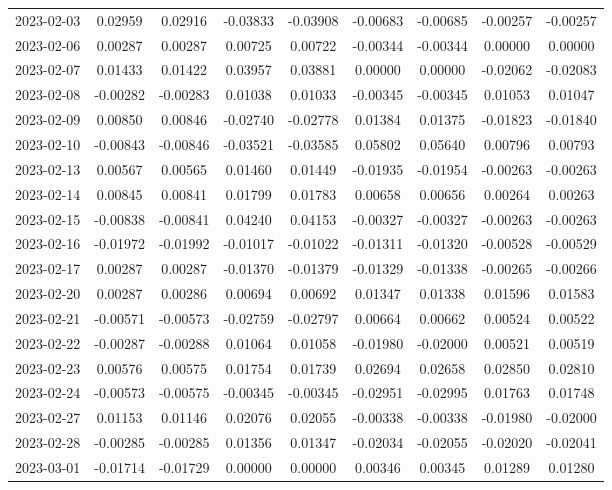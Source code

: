 {\begin{footnotesize}
\begin{longtable}{lcccccccc}
2023-02-03 & 0.02959 & 0.02916 & -0.03833 & -0.03908 & -0.00683 & -0.00685 & -0.00257 & -0.00257 \\
2023-02-06 & 0.00287 & 0.00287 & 0.00725 & 0.00722 & -0.00344 & -0.00344 & 0.00000 & 0.00000 \\
2023-02-07 & 0.01433 & 0.01422 & 0.03957 & 0.03881 & 0.00000 & 0.00000 & -0.02062 & -0.02083 \\
2023-02-08 & -0.00282 & -0.00283 & 0.01038 & 0.01033 & -0.00345 & -0.00345 & 0.01053 & 0.01047 \\
2023-02-09 & 0.00850 & 0.00846 & -0.02740 & -0.02778 & 0.01384 & 0.01375 & -0.01823 & -0.01840 \\
2023-02-10 & -0.00843 & -0.00846 & -0.03521 & -0.03585 & 0.05802 & 0.05640 & 0.00796 & 0.00793 \\
2023-02-13 & 0.00567 & 0.00565 & 0.01460 & 0.01449 & -0.01935 & -0.01954 & -0.00263 & -0.00263 \\
2023-02-14 & 0.00845 & 0.00841 & 0.01799 & 0.01783 & 0.00658 & 0.00656 & 0.00264 & 0.00263 \\
2023-02-15 & -0.00838 & -0.00841 & 0.04240 & 0.04153 & -0.00327 & -0.00327 & -0.00263 & -0.00263 \\
2023-02-16 & -0.01972 & -0.01992 & -0.01017 & -0.01022 & -0.01311 & -0.01320 & -0.00528 & -0.00529 \\
2023-02-17 & 0.00287 & 0.00287 & -0.01370 & -0.01379 & -0.01329 & -0.01338 & -0.00265 & -0.00266 \\
2023-02-20 & 0.00287 & 0.00286 & 0.00694 & 0.00692 & 0.01347 & 0.01338 & 0.01596 & 0.01583 \\
2023-02-21 & -0.00571 & -0.00573 & -0.02759 & -0.02797 & 0.00664 & 0.00662 & 0.00524 & 0.00522 \\
2023-02-22 & -0.00287 & -0.00288 & 0.01064 & 0.01058 & -0.01980 & -0.02000 & 0.00521 & 0.00519 \\
2023-02-23 & 0.00576 & 0.00575 & 0.01754 & 0.01739 & 0.02694 & 0.02658 & 0.02850 & 0.02810 \\
2023-02-24 & -0.00573 & -0.00575 & -0.00345 & -0.00345 & -0.02951 & -0.02995 & 0.01763 & 0.01748 \\
2023-02-27 & 0.01153 & 0.01146 & 0.02076 & 0.02055 & -0.00338 & -0.00338 & -0.01980 & -0.02000 \\
2023-02-28 & -0.00285 & -0.00285 & 0.01356 & 0.01347 & -0.02034 & -0.02055 & -0.02020 & -0.02041 \\
2023-03-01 & -0.01714 & -0.01729 & 0.00000 & 0.00000 & 0.00346 & 0.00345 & 0.01289 & 0.01280 \\

\end{longtable}
\end{footnotesize}}
